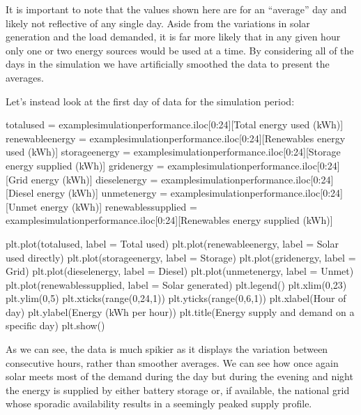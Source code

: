 \documentclass[letterpaper,10pt,english]{sphinxmanual}
\begin{document}
\sphinxAtStartPar
It is important to note that the values shown here are for an “average”
day and likely not reflective of any single day. Aside from the
variations in solar generation and the load demanded, it is far more
likely that in any given hour only one or two energy sources would be
used at a time. By considering all of the days in the simulation we have
artificially smoothed the data to present the averages.

\sphinxAtStartPar
Let’s instead look at the first day of data for the simulation period:

\begin{sphinxVerbatim}[commandchars=\\\{\}]
total\PYGZus{}used = example\PYGZus{}simulation\PYGZus{}performance.iloc[0:24][\PYGZsq{}Total energy used (kWh)\PYGZsq{}]
renewable\PYGZus{}energy = example\PYGZus{}simulation\PYGZus{}performance.iloc[0:24][\PYGZsq{}Renewables energy used (kWh)\PYGZsq{}]
storage\PYGZus{}energy = example\PYGZus{}simulation\PYGZus{}performance.iloc[0:24][\PYGZsq{}Storage energy supplied (kWh)\PYGZsq{}]
grid\PYGZus{}energy = example\PYGZus{}simulation\PYGZus{}performance.iloc[0:24][\PYGZsq{}Grid energy (kWh)\PYGZsq{}]
diesel\PYGZus{}energy = example\PYGZus{}simulation\PYGZus{}performance.iloc[0:24][\PYGZsq{}Diesel energy (kWh)\PYGZsq{}]
unmet\PYGZus{}energy = example\PYGZus{}simulation\PYGZus{}performance.iloc[0:24][\PYGZsq{}Unmet energy (kWh)\PYGZsq{}]
renewables\PYGZus{}supplied = example\PYGZus{}simulation\PYGZus{}performance.iloc[0:24][\PYGZsq{}Renewables energy supplied (kWh)\PYGZsq{}]

plt.plot(total\PYGZus{}used, label = \PYGZsq{}Total used\PYGZsq{})
plt.plot(renewable\PYGZus{}energy, label = \PYGZsq{}Solar used directly\PYGZsq{})
plt.plot(storage\PYGZus{}energy, label = \PYGZsq{}Storage\PYGZsq{})
plt.plot(grid\PYGZus{}energy, label = \PYGZsq{}Grid\PYGZsq{})
plt.plot(diesel\PYGZus{}energy, label = \PYGZsq{}Diesel\PYGZsq{})
plt.plot(unmet\PYGZus{}energy, label = \PYGZsq{}Unmet\PYGZsq{})
plt.plot(renewables\PYGZus{}supplied, label = \PYGZsq{}Solar generated\PYGZsq{})
plt.legend()
plt.xlim(0,23)
plt.ylim(0,5)
plt.xticks(range(0,24,1))
plt.yticks(range(0,6,1))
plt.xlabel(\PYGZsq{}Hour of day\PYGZsq{})
plt.ylabel(\PYGZsq{}Energy (kWh per hour)\PYGZsq{})
plt.title(\PYGZsq{}Energy supply and demand on a specific day\PYGZsq{})
plt.show()
\end{sphinxVerbatim}

\noindent{}

\sphinxAtStartPar
As we can see, the data is much spikier as it displays the variation
between consecutive hours, rather than smoother averages. We can see how
once again solar meets most of the demand during the day but during the
evening and night the energy is supplied by either battery storage or,
if available, the national grid \sphinxhyphen{} whose sporadic availability results in
a seemingly peaked supply profile.
\end{document}
